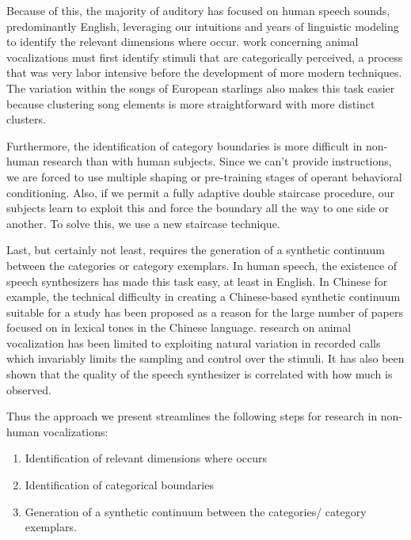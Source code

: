 Because of this, the majority of auditory \CP has focused on human speech sounds, predominantly English, leveraging our intuitions and years of linguistic modeling to identify the relevant dimensions where \CP occur. \CP work concerning animal vocalizations must first identify stimuli that are categorically perceived, a process that was very labor intensive\cite{swamp sparrow series of papers} before the development of more modern techniques\cite{Tim's paper on distribution}. The variation within the songs of European starlings also makes this task easier because clustering song elements is more straightforward with more distinct clusters.

Furthermore, the identification of category boundaries is more difficult in non-human research than with human subjects. Since we can't provide instructions, we are forced to use multiple shaping or pre-training stages of operant behavioral conditioning. Also, if we permit a fully adaptive double staircase procedure, our subjects learn to exploit this and force the boundary all the way to one side or another. To solve this, we use a new staircase technique.

Last, but certainly not least, \CP requires the generation of a synthetic continuum between the categories or category exemplars. In human speech, the existence of speech synthesizers has made this task easy, at least in English. In Chinese for example, the technical difficulty in creating a Chinese-based synthetic continuum suitable for a \CP study has been proposed as a reason for the large number of papers focused on \CP in lexical tones in the Chinese language\cite{zhang2013categorical}. \CP research on animal vocalization has been limited to exploiting natural variation in recorded calls\cite{swamp sparrow cp} which invariably limits the sampling and control over the stimuli. It has also been shown that the quality of the speech synthesizer is correlated with how much \CP is observed\cite{van1999categorical}.

Thus the approach we present streamlines the following steps for \CP research in non-human vocalizations:
\begin{enumerate}
    \item Identification of relevant dimensions where \CP occurs
    \item Identification of categorical boundaries
    \item Generation of a synthetic continuum between the categories/ category exemplars.
\end{enumerate}